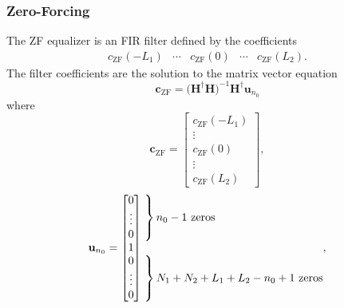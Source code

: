 \subsubsection{Zero-Forcing}
\label{sec:zero-forcing}
The ZF equalizer is an FIR filter defined by the coefficients
\begin{equation}
\begin{matrix}
c_\text{ZF}(-L_1) & \cdots & c_\text{ZF}(0) & \cdots & c_\text{ZF}(L_2).
\end{matrix}
\end{equation}
The filter coefficients are the solution to the matrix vector equation \cite[eq. (311)]{PAQ-phase1}
\begin{equation}
\mathbf{c}_\text{ZF} = \big(\mathbf{H}^\dagger\mathbf{H}\big)^{-1} \mathbf{H}^\dagger \mathbf{u}_{n_0}
\label{eq:c_ZF_direct}
\end{equation}
where
\begin{equation}
\mathbf{c}_\text{ZF} = 
\begin{bmatrix}
c_\text{ZF}(-L_1) \\ \vdots \\ c_\text{ZF}(0) \\ \vdots \\ c_\text{ZF}(L_2)
\end{bmatrix},
\end{equation}
\begin{equation}
\mathbf{u}_{n_0} = \begin{bmatrix} 0 \\ \vdots \\ 0 \\ 1 \\ 0 \\ \vdots \\ 0 \end{bmatrix}
	\begin{matrix*}[l] \left. \vphantom{\begin{matrix} 0 \\ \vdots \\ 0 \end{matrix}} \right\}
		\text{$n_0-1$ zeros}
		\\ \\
		\left. \vphantom{\begin{matrix} 0 \\ \vdots \\ 0 \end{matrix}} \right\}
		\text{$N_1+N_2+L_1+L_2-n_0+1$ zeros}
		\end{matrix*},
		\label{eq:un0_ZF}
\end{equation}
